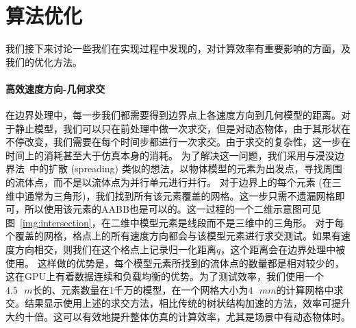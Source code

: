 \section{算法优化}
\label{sec:sig23_alg_optimal}
我们接下来讨论一些我们在实现过程中发现的，对计算效率有重要影响的方面，及我们的优化方法。

\paragraph{高效速度方向-几何求交}
在边界处理中，每一步我们都需要得到边界点上各速度方向到几何模型的距离。对于静止模型，我们可以只在前处理中做一次求交，但是对动态物体，由于其形状在不停改变，我们需要在每个时间步都进行一次求交。由于求交的复杂性，这一步在时间上的消耗甚至大于仿真本身的消耗。
为了解决这一问题，我们采用与浸没边界法~\citep{Chen-2021}中的扩散 (spreading) 类似的想法，以物体模型的元素为出发点，寻找周围的流体点，而不是以流体点为并行单元进行并行。
对于边界上的每个元素 (在三维中通常为三角形)，我们找到所有该元素覆盖的网格。这一步只需不遗漏网格即可，所以使用该元素的AABB也是可以的。这一过程的一个二维示意图可见图~\ref{img:intersection}，在二维中模型元素是线段而不是三维中的三角形。
对于每个覆盖的网格，格点上的所有速度方向都会与该模型元素进行求交测试。如果有速度方向相交，则我们在这个格点上记录归一化距离$q$，这个距离会在边界处理中被使用。
这样做的优势是，每个模型元素所找到的流体点的数量都是相对较少的，这在GPU上有着数据连续和负载均衡的优势。为了测试效率，我们使用一个$4.5 \text{ } m$长的、元素数量在1千万的模型，在一个网格大小为$4 \text{ } mm$的计算网格中求交。结果显示使用上述的求交方法，相比传统的树状结构加速的方法，效率可提升大约十倍。这可以有效地提升整体仿真的计算效率，尤其是场景中有动态物体时。

